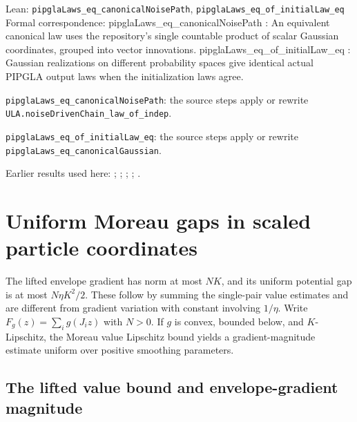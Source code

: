 \documentclass[11pt,a4paper]{report}
\begin{document}
\begin{leanbox}{Lean: \texttt{pipglaLaws\_\allowbreak{}eq\_\allowbreak{}canonicalNoisePath}, \texttt{pipglaLaws\_\allowbreak{}eq\_\allowbreak{}of\_\allowbreak{}initialLaw\_\allowbreak{}eq}}
Formal correspondence: pipglaLaws\_eq\_canonicalNoisePath : An equivalent canonical law uses the repository's single countable product of scalar Gaussian coordinates, grouped into vector innovations. pipglaLaws\_eq\_of\_initialLaw\_eq : Gaussian realizations on different probability spaces give identical actual PIPGLA output laws when the initialization laws agree.



\texttt{pipgla\allowbreak{}Laws\_\allowbreak{}eq\_\allowbreak{}canonical\allowbreak{}Noise\allowbreak{}Path}: the source steps apply or rewrite \texttt{ULA.\allowbreak{}noise\allowbreak{}Driven\allowbreak{}Chain\_\allowbreak{}law\_\allowbreak{}of\_\allowbreak{}indep}.



\texttt{pipgla\allowbreak{}Laws\_\allowbreak{}eq\_\allowbreak{}of\_\allowbreak{}initial\allowbreak{}Law\_\allowbreak{}eq}: the source steps apply or rewrite \texttt{pipgla\allowbreak{}Laws\_\allowbreak{}eq\_\allowbreak{}canonical\allowbreak{}Gaussian}.
\end{leanbox}


Earlier results used here: \cite[Section~3.20.5]{LangevinLean2026ULASC}; \cite[Section~3.20.7]{LangevinLean2026ULASC}; \cite[Section~3.1.1]{LangevinLean2026IPLA}; \cite[Section~3.15.1]{LangevinLean2026IPLA}; \cite[Section~3.3.2]{LangevinLean2026IPLA}.
\section{\texorpdfstring{Uniform Moreau gaps in scaled particle coordinates}{Uniform Moreau gaps in scaled particle coordinates}}
\label{proof-module-ProximalLangevin-ParticleSmoothing-lean}


The lifted envelope gradient has norm at most \(NK\), and its uniform potential gap is at most \(N\eta K^2/2\). These follow by summing the single-pair value estimates and are different from gradient variation with constant involving \(1/\eta\). Write \(F_g(z)=\sum_i g(J_i z)\) with \(N>0\). If \(g\) is convex, bounded below, and \(K\)-Lipschitz, the Moreau value Lipschitz bound yields a gradient-magnitude estimate uniform over positive smoothing parameters.

\subsection{\texorpdfstring{The lifted value bound and envelope-gradient magnitude}{The lifted value bound and envelope-gradient magnitude}}
\label{report-step-ProximalLangevin-ParticleSmoothing-lean-1}
\end{document}
